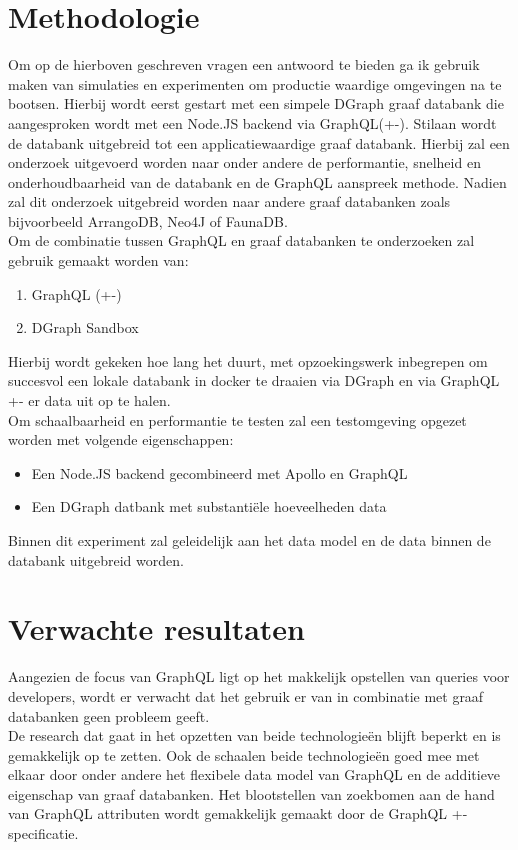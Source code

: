 
\section{Methodologie}
\label{sec:methodologie}

Om op de hierboven geschreven vragen een antwoord te bieden ga ik gebruik maken van simulaties en experimenten om productie waardige omgevingen na te bootsen. Hierbij wordt eerst gestart met een simpele DGraph graaf databank die aangesproken wordt met een Node.JS backend via GraphQL(+-). Stilaan wordt de databank uitgebreid tot een applicatiewaardige graaf databank. Hierbij  zal een onderzoek uitgevoerd worden naar onder andere de performantie, snelheid en onderhoudbaarheid van de databank en de GraphQL aanspreek methode. Nadien zal dit onderzoek uitgebreid worden naar andere graaf databanken zoals bijvoorbeeld ArrangoDB, Neo4J of FaunaDB.\\
Om de combinatie tussen GraphQL en graaf databanken te onderzoeken zal gebruik gemaakt worden van: 
\begin{enumerate}
	\item GraphQL (+-)
	\item DGraph Sandbox
\end{enumerate}
Hierbij wordt gekeken hoe lang het duurt, met opzoekingswerk inbegrepen om succesvol een lokale databank in docker te draaien via DGraph en via GraphQL +- er data uit op te halen.\\
Om schaalbaarheid en performantie te testen zal een testomgeving opgezet worden met volgende eigenschappen:
\begin{itemize}
	\item Een Node.JS backend gecombineerd met Apollo en GraphQL
	\item Een DGraph datbank met substantiële hoeveelheden data
\end{itemize}
Binnen dit experiment zal geleidelijk aan het data model en de data binnen de databank uitgebreid worden.

\section{Verwachte resultaten}
\label{sec:verwachte_resultaten}
Aangezien de focus van GraphQL ligt op het makkelijk opstellen van queries voor developers, wordt er verwacht dat het gebruik er van in combinatie met graaf databanken geen probleem geeft. \\
De research dat gaat in het opzetten van beide technologieën blijft beperkt en is gemakkelijk op te zetten. Ook de schaalen beide technologieën goed mee met elkaar door onder andere het flexibele data model van GraphQL en de additieve eigenschap van graaf databanken. Het blootstellen van zoekbomen aan de hand van GraphQL attributen wordt gemakkelijk gemaakt door de GraphQL +- specificatie.

